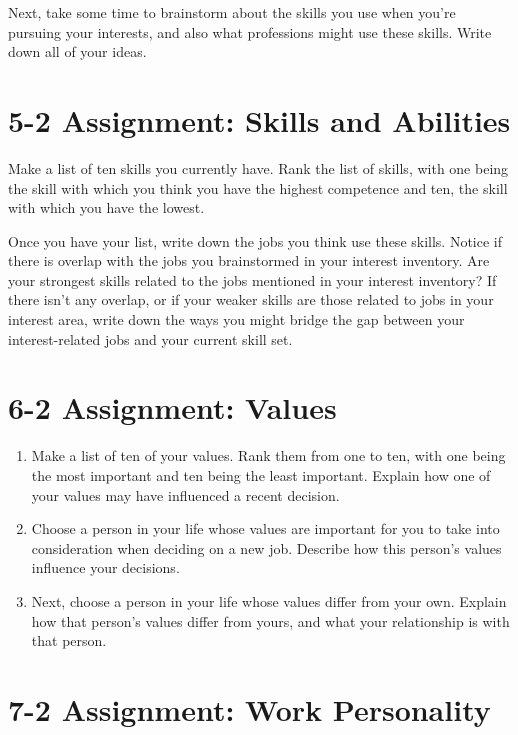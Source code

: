 Next, take some time to brainstorm about the skills you use when you're pursuing your interests, and also what professions might use these skills. Write down all of your ideas.

\clearpage \section*{5-2 Assignment: Skills and Abilities}
 
Make a list of ten skills you currently have. Rank the list of skills, with one being the skill with which you think you have the highest competence and ten, the skill with which you have the lowest.

Once you have your list, write down the jobs you think use these skills. Notice if there is overlap with the jobs you brainstormed in your interest inventory. Are your strongest skills related to the jobs mentioned in your interest inventory? If there isn't any overlap, or if your weaker skills are those related to jobs in your interest area, write down the ways you might bridge the gap between your interest-related jobs and your current skill set.

\clearpage \section*{6-2 Assignment: Values}
 
\begin{enumerate}[leftmargin=1cm]
	\item Make a list of ten of your values. Rank them from one to ten, with one being the most important and ten being the least important.
	      Explain how one of your values may have influenced a recent decision.
	\item Choose a person in your life whose values are important for you to take into consideration when deciding on a new job. Describe how this person's values influence your decisions.
	\item Next, choose a person in your life whose values differ from your own. Explain how that person's values differ from yours, and what your relationship is with that person.
\end{enumerate}

\clearpage \section*{7-2 Assignment: Work Personality}
 
